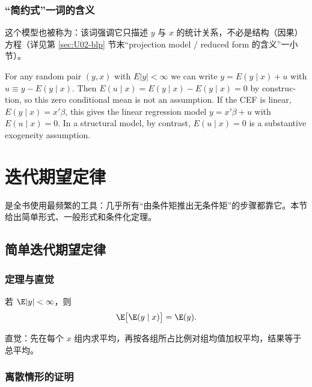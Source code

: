 \subsubsection{“简约式”一词的含义}

这个模型也被称为：该词强调它只描述 $y$ 与 $x$ 的统计关系，不必是结构（因果）方程（详见第 \ref{sec:U02-blp} 节末“projection model / reduced form 的含义”一小节）。

\begin{english}
For any random pair $(y,x)$ with $E|y|<\infty$ we can write $y=E(y\mid x)+u$ with $u\equiv y-E(y\mid x)$. Then $E(u\mid x)=E(y\mid x)-E(y\mid x)=0$ by construction, so this zero conditional mean is not an assumption. If the CEF is linear, $E(y\mid x)=x'\beta$, this gives the linear regression model $y=x'\beta+u$ with $E(u\mid x)=0$. In a structural model, by contrast, $E(u\mid x)=0$ is a substantive exogeneity assumption.
\end{english}

\section{迭代期望定律}\label{sec:U02-lie}

是全书使用最频繁的工具：几乎所有“由条件矩推出无条件矩”的步骤都靠它。本节给出简单形式、一般形式和条件化定理。

\subsection{简单迭代期望定律}

\subsubsection{定理与直觉}

\begin{thm}[简单迭代期望定律]\label{thm:U02-lie}
若 $\E|y|<\infty$，则
\[
\E\big[\E(y\mid x)\big]=\E(y).
\]
\end{thm}

直觉：先在每个 $x$ 组内求平均，再按各组所占比例对组均值加权平均，结果等于总平均。

\subsubsection{离散情形的证明}

